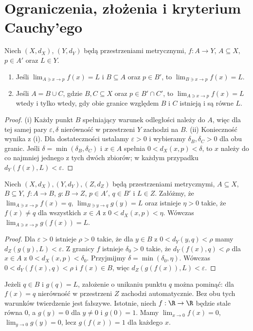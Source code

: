 \section{Ograniczenia, złożenia i kryterium Cauchy'ego}
\begin{twierdzenie}
\label{ma1:thm:limit-restriction-union}
Niech $(X,d_X)$, $(Y,d_Y)$ będą przestrzeniami metrycznymi, $f:A\to Y$, $A\subseteq X$, $p\in A'$ oraz $L\in Y$.
\begin{enumerate}[label=(\roman*)]
\item Jeśli $\lim_{A\ni x\to p}f(x)=L$ i $B\subseteq A$ oraz $p\in B'$, to $\lim_{B\ni x\to p}f(x)=L$.
\item Jeśli $A=B\cup C$, gdzie $B,C\subseteq X$ oraz $p\in B'\cap C'$, to $\lim_{A\ni x\to p}f(x)=L$ wtedy i tylko wtedy, gdy obie granice względem $B$ i $C$ istnieją i są równe $L$.
\end{enumerate}
\end{twierdzenie}
\begin{proof}
(i) Każdy punkt $B$ spełniający warunek odległości należy do $A$, więc dla tej samej pary $\varepsilon,\delta$ nierówność w przestrzeni $Y$ zachodzi na $B$.
(ii) Konieczność wynika z (i). Dla dostateczności ustalamy $\varepsilon>0$ i wybieramy $\delta_B,\delta_C>0$ dla obu granic. Jeśli $\delta=\min(\delta_B,\delta_C)$ i $x\in A$ spełnia $0<d_X(x,p)<\delta$, to $x$ należy do co najmniej jednego z tych dwóch zbiorów; w każdym przypadku $d_Y(f(x),L)<\varepsilon$.
\end{proof}
\begin{twierdzenie}
\label{ma1:thm:limit-composition}
Niech $(X,d_X),(Y,d_Y),(Z,d_Z)$ będą przestrzeniami metrycznymi, $A\subseteq X$, $B\subseteq Y$, $f:A\to B$, $g:B\to Z$, $p\in A'$, $q\in B'$ i $L\in Z$. Załóżmy, że $\lim_{A\ni x\to p}f(x)=q$, $\lim_{B\ni y\to q}g(y)=L$ oraz istnieje $\eta>0$ takie, że $f(x)\ne q$ dla wszystkich $x\in A$ z $0<d_X(x,p)<\eta$. Wówczas $\lim_{A\ni x\to p}g(f(x))=L$.
\end{twierdzenie}
\begin{proof}
Dla $\varepsilon>0$ istnieje $\rho>0$ takie, że dla $y\in B$ z $0<d_Y(y,q)<\rho$ mamy $d_Z(g(y),L)<\varepsilon$. Z granicy $f$ istnieje $\delta_0>0$ takie, że $d_Y(f(x),q)<\rho$ dla $x\in A$ z $0<d_X(x,p)<\delta_0$. Przyjmijmy $\delta=\min(\delta_0,\eta)$. Wówczas $0<d_Y(f(x),q)<\rho$ i $f(x)\in B$, więc $d_Z(g(f(x)),L)<\varepsilon$.
\end{proof}
\begin{uwaga}
\label{ma1:rem:composition-zero}
Jeżeli $q\in B$ i $g(q)=L$, założenie o unikaniu punktu $q$ można pominąć: dla $f(x)=q$ nierówność w przestrzeni $Z$ zachodzi automatycznie. Bez obu tych warunków twierdzenie jest fałszywe. Istotnie, niech $f:\R\to\R$ będzie stale równa $0$, a $g(y)=0$ dla $y\ne0$ i $g(0)=1$. Mamy $\lim_{x\to0}f(x)=0$, $\lim_{y\to0}g(y)=0$, lecz $g(f(x))=1$ dla każdego $x$.
\end{uwaga}

